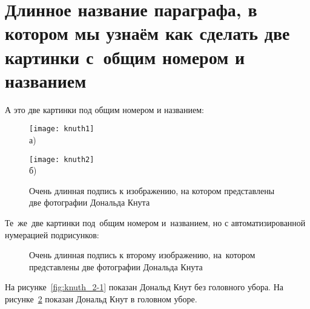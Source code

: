\section{Длинное название параграфа, в котором мы узнаём как сделать две картинки с~общим номером и названием}\label{sec:ch2/sect2}

А это две картинки под общим номером и названием:
\begin{figure}[ht]
  \begin{minipage}[b][][b]{0.49\linewidth}\centering
    \texttt{[image: knuth1]} \\ а)
  \end{minipage}
  \hfill
  \begin{minipage}[b][][b]{0.49\linewidth}\centering
    \texttt{[image: knuth2]} \\ б)
  \end{minipage}
  \caption{Очень длинная подпись к изображению,
      на котором представлены две фотографии Дональда Кнута}
  \label{fig:knuth}
\end{figure}

Те~же~две картинки под~общим номером и~названием,
но с автоматизированной нумерацией подрисунков:
\begin{figure}[ht]
    \caption[Этот текст попадает в названия рисунков в списке рисунков]{Очень
    длинная подпись к второму изображению, на~котором представлены две
    фотографии Дональда Кнута}\label{fig:knuth_2}
\end{figure}

На рисунке~\ref{fig:knuth_2-1} показан Дональд Кнут без головного убора.
На рисунке~\ref{fig:knuth_2}
показан Дональд Кнут в головном уборе.

